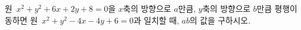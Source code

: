 원~$x^2+y^2+6x+2y+8=0$을 $x$축의 방향으로 $a$만큼, $y$축의 방향으로 $b$만큼 평행이동하면 원~$x^2+y^2-4x-4y+6=0$과 일치할 때, $ab$의 값을 구하시오.
